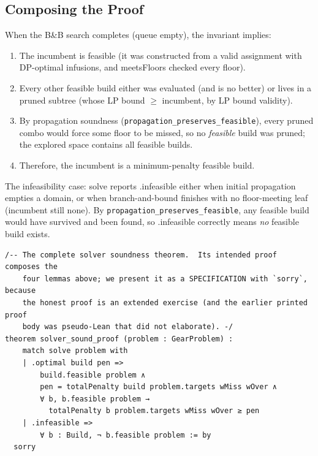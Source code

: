 \documentclass[11pt, a4paper, oneside]{book}
\newcommand{\li}[1]{{\ttfamily\small\color{deepblue}#1}}
\begin{document}
\subsection{Composing the Proof}

When the B\&B search completes (queue empty), the invariant implies:
\begin{enumerate}[nosep]
  \item The incumbent is feasible (it was constructed from a valid assignment
    with DP-optimal infusions, and \li{meetsFloors} checked every floor).
  \item Every other feasible build either was evaluated (and is no better)
    or lives in a pruned subtree (whose LP bound $\geq$ incumbent, by LP
    bound validity).
  \item By propagation soundness (\texttt{propagation\_preserves\_feasible}),
    every pruned combo would force some floor to be missed, so no
    \emph{feasible} build was pruned; the explored space contains all
    feasible builds.
  \item Therefore, the incumbent is a minimum-penalty feasible build.
\end{enumerate}

The infeasibility case: \li{solve} reports \li{.infeasible} either when initial
propagation empties a domain, or when branch-and-bound finishes with no
floor-meeting leaf (incumbent still \li{none}).  By
\texttt{propagation\_preserves\_feasible}, any feasible build would have
survived and been found, so \li{.infeasible} correctly means \emph{no} feasible
build exists.

\begin{leanbox}[title={Lean 4 (Mathlib) --- Composing the Full Proof (specification)}]
\begin{verbatim}
/-- The complete solver soundness theorem.  Its intended proof composes the
    four lemmas above; we present it as a SPECIFICATION with `sorry`, because
    the honest proof is an extended exercise (and the earlier printed proof
    body was pseudo-Lean that did not elaborate). -/
theorem solver_sound_proof (problem : GearProblem) :
    match solve problem with
    | .optimal build pen =>
        build.feasible problem ∧
        pen = totalPenalty build problem.targets wMiss wOver ∧
        ∀ b, b.feasible problem →
          totalPenalty b problem.targets wMiss wOver ≥ pen
    | .infeasible =>
        ∀ b : Build, ¬ b.feasible problem := by
  sorry
\end{verbatim}
\end{leanbox}
\end{document}
